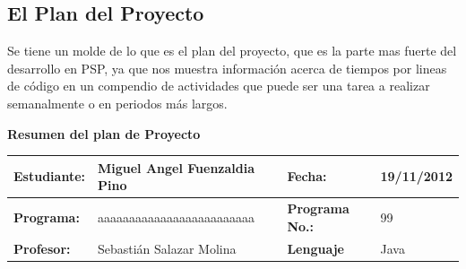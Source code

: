 \documentclass[a4paper,12pt,openany,oneside]{book}
\begin{document}
\subsection{El Plan del Proyecto}
Se tiene un molde de lo que es el plan del proyecto, que es la parte mas fuerte del desarrollo en PSP, ya que nos muestra información acerca de tiempos por lineas de código en un compendio de actividades que puede ser una tarea a realizar semanalmente o en periodos más largos.

\textbf{Resumen del plan de Proyecto}\\
\begin{tabular}{| l | l | l | l |}
\hline
\textbf{Estudiante:} & Miguel Angel Fuenzaldia Pino & \textbf{Fecha:} & 19/11/2012\\
\hline
\textbf{Programa:} & aaaaaaaaaaaaaaaaaaaaaaaaa & \textbf{Programa No.:} & 99\\
\hline
\textbf{Profesor:} & Sebastián Salazar Molina & \textbf{Lenguaje} & Java  \\
\hline
\end{tabular}
\\\\\\
\end{document}
